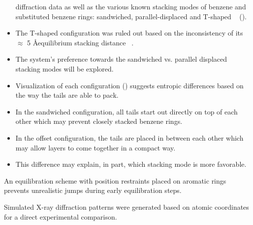 \documentclass{article}
\newcommand{\angstrom}{\textup{\AA}}
\begin{document}
\begin{itemize}
    diffraction data as well as the various known stacking modes of benzene 
    and substituted benzene rings: sandwiched, parallel-displaced and T-shaped
    ~\cite{sinnokrot_estimates_2002} ().
    \item The T-shaped configuration was ruled out based on the inconsistency of
    its $\approx$ 5 \angstrom equilibrium stacking distance ~\cite{sinnokrot_estimates_2002}.
    \item The system's preference towards the sandwiched vs. parallel displaced 
    stacking modes will be explored.
    \item Visualization of each configuration ()
    suggests entropic differences based on the way the tails are able to pack.
    \item In the sandwiched configuration, all tails start out directly on top
    of each other which may prevent closely stacked benzene rings.
    \item In the offset configuration, the tails are placed in between each other 
    which may allow layers to come together in a compact way.
    \item This difference may explain, in part, which stacking mode is more favorable.
  \end{itemize}

  An equilibration scheme with position restraints placed on aromatic rings
  prevents unrealistic jumps during early equilibration steps.
  
  Simulated X-ray diffraction patterns were generated based on atomic
  coordinates for a direct experimental comparison.
  
\end{document}
